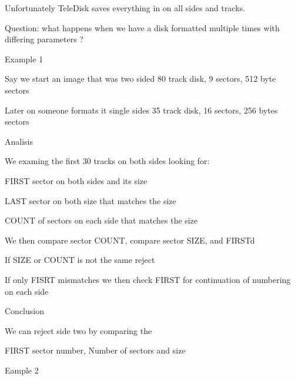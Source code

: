 \begin{DoxyItemize}
\item Unfortunately Tele\+Disk saves everything in on all sides and tracks.
\begin{DoxyItemize}
\item Question\+: what happens when we have a disk formatted multiple times with differing parameters ?
\end{DoxyItemize}
\item Example 1
\begin{DoxyItemize}
\item Say we start an image that was two sided 80 track disk, 9 sectors, 512 byte sectors
\item Later on someone formats it single sides 35 track disk, 16 sectors, 256 bytes sectors
\end{DoxyItemize}
\item Analisis
\begin{DoxyItemize}
\item We examing the first 30 tracks on both sides looking for\+:
\begin{DoxyItemize}
\item F\+I\+R\+ST sector on both sides and its size
\item L\+A\+ST sector on both size that matches the size
\item C\+O\+U\+NT of sectors on each side that matches the size
\end{DoxyItemize}
\item We then compare sector C\+O\+U\+NT, compare sector S\+I\+ZE, and F\+I\+R\+S\+Td
\begin{DoxyItemize}
\item If S\+I\+ZE or C\+O\+U\+NT is not the same reject
\item If only F\+I\+S\+RT mismatches we then check F\+I\+R\+ST for continuation of numbering on each side
\end{DoxyItemize}
\end{DoxyItemize}
\item Conclusion
\begin{DoxyItemize}
\item We can reject side two by comparing the
\begin{DoxyItemize}
\item F\+I\+R\+ST sector number, Number of sectors and size
\end{DoxyItemize}
\end{DoxyItemize}
\item Eample 2
\begin{DoxyItemize}

\end{DoxyItemize}
\end{DoxyItemize}
